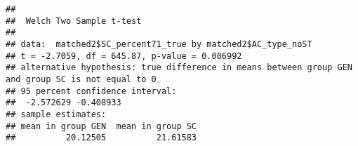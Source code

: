 \documentclass[
]{article}
\newenvironment{Shaded}{\begin{snugshade}}{\end{snugshade}}
\newcommand{\FunctionTok}[1]{\textcolor[rgb]{0.00,0.00,0.00}{#1}}
\newcommand{\NormalTok}[1]{#1}
\newcommand{\SpecialCharTok}[1]{\textcolor[rgb]{0.00,0.00,0.00}{#1}}
\begin{document}
\begin{Shaded}
\end{Shaded}

\begin{verbatim}
## 
##  Welch Two Sample t-test
## 
## data:  matched2$SC_percent71_true by matched2$AC_type_noST
## t = -2.7059, df = 645.87, p-value = 0.006992
## alternative hypothesis: true difference in means between group GEN and group SC is not equal to 0
## 95 percent confidence interval:
##  -2.572629 -0.408933
## sample estimates:
## mean in group GEN  mean in group SC 
##          20.12505          21.61583
\end{verbatim}
\end{document}
